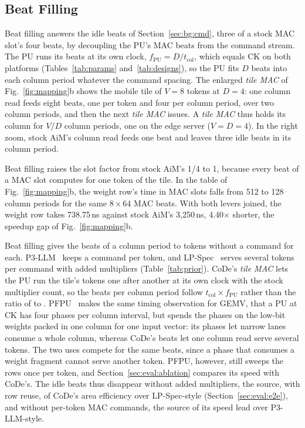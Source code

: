 \subsection{Beat Filling}
\label{sec:design:beat}

Beat filling answers the idle beats of Section~\ref{sec:bg:cmd}, three of a stock MAC slot's four beats, by decoupling
the PU's MAC beats from the command stream. The PU runs its beats at its own clock, $f_\mathrm{PU} = D /
t_\mathrm{col}$, which equals CK on both platforms (Tables~\ref{tab:params} and~\ref{tab:designs}), so the PU fits $D$ beats into each column
period whatever the command spacing. The enlarged \emph{tile MAC} of Fig.~\ref{fig:mapping}b shows the mobile tile of
$V = 8$ tokens at $D = 4$: one column read feeds eight beats, one per token and four per column period, over two column
periods, and then the next \emph{tile MAC} issues. A \emph{tile MAC} thus holds its column for $V/D$ column periods, one
on the edge server ($V = D = 4$). In the right zoom, stock AiM's column read feeds one beat and leaves three idle beats in its
column period.

Beat filling raises the slot factor from stock AiM's 1/4 to 1, because every beat of a MAC slot computes for one token
of the tile. In the table of Fig.~\ref{fig:mapping}b, the weight row's time in MAC slots falls from 512
to 128 column periods for the same $8 \times 64$ MAC beats. With both levers joined, the weight row takes 738.75\,ns
against stock AiM's 3,250\,ns, 4.40$\times$ shorter, the speedup gap of Fig.~\ref{fig:mapping}b.

Beat filling gives the beats of a column period to tokens without a command for each. P3-LLM~\cite{p3llm} keeps a
command per token, and LP-Spec~\cite{lpspec} serves several tokens per command with added multipliers
(Table~\ref{tab:prior}). CoDe's \emph{tile MAC} lets the PU run the tile's tokens one after another at its own clock
with the stock multiplier count, so the beats per column period follow $t_\mathrm{col} \times f_\mathrm{PU}$ rather
than the ratio of \tccdl{} to \tccds. PFPU~\cite{pfpu} makes the same timing observation for
GEMV, that a PU at CK has four phases per column interval, but spends the phases on the low-bit weights packed in one
column for one input vector: its phases let narrow lanes consume a whole column, whereas CoDe's beats let one column
read serve several tokens. The two uses compete for the same beats, since a phase that consumes a weight fragment
cannot serve another token. PFPU, however, still sweeps the rows once per token, and Section~\ref{sec:eval:ablation}
compares its speed with CoDe's. The idle beats thus disappear without added
multipliers, the source, with row reuse, of CoDe's area efficiency over LP-Spec-style (Section~\ref{sec:eval:e2e}), and
without per-token MAC commands, the source of its speed lead over P3-LLM-style.

